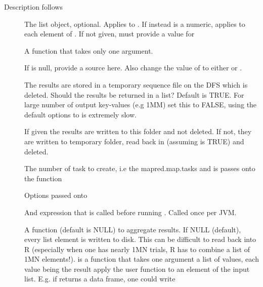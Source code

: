 \documentclass[letterpaper,10pt,english]{sphinxmanual}
\begin{document}
Description follows
\begin{description}
\item[{}] \leavevmode
The list object, optional. Applies  to  .
If instead  is a numeric, applies  to each element of
. If not given, must provide a value for 

\item[{}] \leavevmode
A function that takes only one argument.

\item[{}] \leavevmode
If  is null, provide a source here. Also change the value of
 to either  or .

\item[{}] \leavevmode
The results are stored in a temporary sequence file on the DFS which is
deleted. Should the results be returned in a list? Default is TRUE. For
large number of output key-values (e.g 1MM) set this to FALSE, using the
default options to  is extremely slow.

\item[{}] \leavevmode
If given the results are written to this folder and not deleted. If not,
they are written to temporary folder, read back in (assuming 
is TRUE) and deleted.

\item[{}] \leavevmode
The number of task to create, i.e the mapred.map.tasks and is passes onto the  function

\item[{}] \leavevmode
Options passed onto 

\item[{}] \leavevmode
And expression that is called before running . Called once per
JVM.

\item[{}] \leavevmode
A function (default is NULL) to aggregate results. If NULL (default), every list element is written to disk.
This can be difficult to read back into R (especially when one has nearly 1MN trials, R has to combine a list
of 1MN elements!).  is a function that takes one argument a list of values, each value being the result
apply the user function to an element of the input list. E.g. if  returns a data frame, one could write

\end{description}
\end{document}

